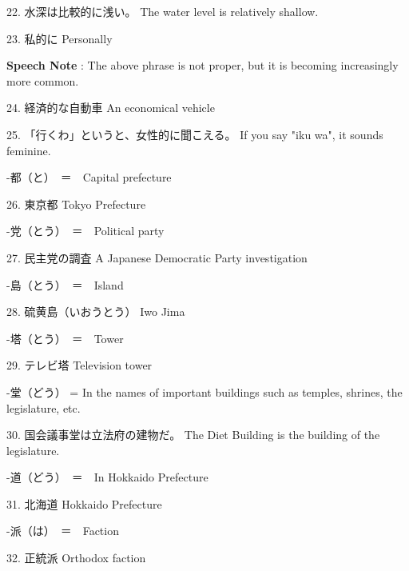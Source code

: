 \par{22. 水深は比較的に浅い。 \hfill\break
The water level is relatively shallow. }

\par{23. 私的に \hfill\break
Personally }

\par{\textbf{Speech Note }: The above phrase is not proper, but it is becoming increasingly more common. }

\par{24. 経済的な自動車 \hfill\break
An economical vehicle }

\par{25. 「行くわ」というと、女性的に聞こえる。 \hfill\break
If you say "iku wa", it sounds feminine. }

\par{-都（と）　＝　Capital prefecture }

\par{26. 東京都 \hfill\break
Tokyo Prefecture }

\par{-党（とう）　＝　Political party }

\par{27. 民主党の調査 \hfill\break
A Japanese Democratic Party investigation }

\par{-島（とう）　＝　Island }

\par{28. 硫黄島（いおうとう） \hfill\break
Iwo Jima }

\par{-塔（とう）　＝　Tower }

\par{29. テレビ塔 \hfill\break
Television tower }

\par{-堂（どう） = In the names of important buildings such as temples, shrines, the legislature, etc. }

\par{30. 国会議事堂は立法府の建物だ。 \hfill\break
The Diet Building is the building of the legislature. }

\par{-道（どう）　＝　In Hokkaido Prefecture }

\par{31. 北海道 \hfill\break
Hokkaido Prefecture }

\par{-派（は）　＝　Faction }

\par{32. 正統派 \hfill\break
Orthodox faction }

